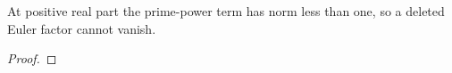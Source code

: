 \begin{theorem}
\label{factor}
\leanok
At positive real part the prime-power term has norm less than one, so a deleted Euler factor cannot vanish.
\end{theorem}
\begin{proof}
\leanok
\end{proof}
